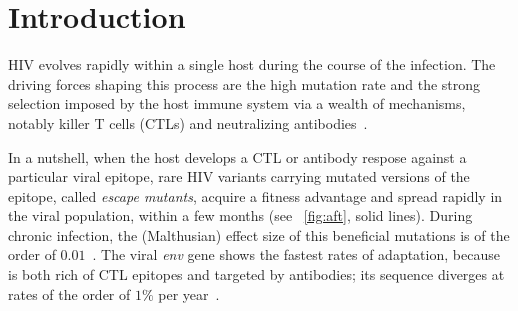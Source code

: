 \documentclass[12pt,a4paper,notitlepage,onecolumn]{article}
\title{\Title}
\author{\Author}
\date{\today}
\newcommand{\env}{\textit{env}}
\begin{document}
\maketitle

\begin{abstract}
\noindent
Intrapatient HIV evolution is goverened by selection on the protein level in the
arms race with the immune system (killer T-cells and antibodies). Synonymous
mutations do not have an immunity-related phenotype and are often assumed to be
neutral. In this paper, we show that synonymous changes in epitope-rich regions
are often deleterious but still reach frequencies of order one.  We analyze time
series of viral sequences from the V1-C5 part of {\it env} within individual
hosts and observe that synonymous derived alleles rarely fix in the
viral population. Simulations suggest that such synonymous mutations
have a (Malthisuan) selection coefficient of the order of $-0.001$, and that
they are brought up to high frequency by linkage to neighbouring beneficial
nonsynonymous alleles (genetic draft). As far as the biological causes are
concerned, we detect a negative correlation between fixation of an allele and
its involvement in evolutionarily conserved RNA stem-loop structures.
This phenonenon is not observed in other parts of the HIV genome, in which
selective sweeps are less dense and the genetic architecture less constrained.
\end{abstract}

\section{Introduction}

HIV evolves rapidly within a single host during the course of the infection. The
driving forces shaping this process are the high mutation rate and the strong
selection imposed by the host immune system via a wealth of mechanisms, notably
killer T cells (CTLs) and neutralizing
antibodies~\citep{pantaleo_immunopathogenesis_1996}.

In a nutshell, when the host develops a CTL or antibody respose against a
particular viral epitope, rare HIV variants carrying mutated versions of the
epitope, called {\it escape mutants}, acquire a fitness advantage and spread
rapidly in the viral population, within a few months (see
\figurename~\ref{fig:aft}, solid lines). During chronic infection, the
(Malthusian) effect size of this beneficial mutations is of the order of
$0.01$~\citep{neher_recombination_2010}. The viral \env{} gene shows the fastest
rates of adaptation, because is both rich of CTL epitopes and targeted by
antibodies; its sequence diverges at rates of the order of $1\%$ per
year~\citep{shankarappa_consistent_1999}.
\end{document}
